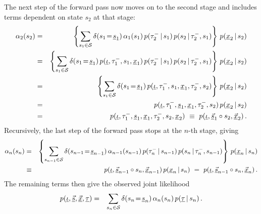 \documentclass[a4paper]{article}
\newcommand{\ui}{\underline{\iota}}
\newcommand{\ut}{\underline{\tau}}
\newcommand{\tm}{\tau^{-}}
\begin{document}
The next step of the forward pass now moves on to the second stage and includes terms dependent on state $s_2$ at that stage:
\begin{eqnarray}
  \alpha_2(s_2) & = & 
\left\{\sum_{s_1\in{\cal S}}\delta(s_1\!=\!\underline{s}_1)\,
\alpha_1(s_1)\,p(\tm_2\,|\,s_1)\,p(s_2\,|\,\tm_2,s_1)\right\}
\,p(\underline{x}_2\,|\,s_2)
\nonumber\\&=&
\left\{\sum_{s_1\in{\cal S}}\delta(s_1\!=\!\underline{s}_1)\,
p(\ui,\tm_1,s_1,\underline{x}_1)\,p(\tm_2\,|\,s_1)\,p(s_2\,|\,\tm_2,s_1)\right\}
\,p(\underline{x}_2\,|\,s_2)
\nonumber\\&=&
\left\{\sum_{s_1\in{\cal S}}\delta(s_1\!=\!\underline{s}_1)\,
p(\ui,\tm_1,s_1,\underline{x}_1,\tm_2,s_2)\right\}
\,p(\underline{x}_2\,|\,s_2)
\nonumber\\&=&
p(\ui,\tm_1,\underline{s}_1,\underline{x}_1,\tm_2,s_2)\,p(\underline{x}_2\,|\,s_2)
\nonumber\\&=&
p(\ui,\tm_1,\underline{s}_1,\underline{x}_1,\tm_2,s_2,\underline{x}_2)
~\equiv~p(\ui,\underline{\vec{s}}_1\circ s_2,\underline{\vec{x}}_2)
\,.
\label{eq:alpha_2}
\end{eqnarray}
Recursively, the last step of the forward pass stops at the $n$-th stage, giving
\begin{eqnarray}
  \alpha_n(s_n) & = & 
\left\{\sum_{s_{n-1}\in{\cal S}}\delta(s_{n-1}\!=\!\underline{s}_{n-1})\,
\alpha_{n-1}(s_{n-1})\,p(\tm_n\,|\,s_{n-1})\,p(s_n\,|\,\tm_n,s_{n-1})\right\}
\,p(\underline{x}_n\,|\,s_n)
\nonumber\\&\equiv&
p(\ui,\underline{\vec{s}}_{n-1}\circ s_n,\underline{\vec{x}}_{n-1})\,p(\underline{x}_n\,|\,s_n)
~=~p(\ui,\underline{\vec{s}}_{n-1}\circ s_n,\underline{\vec{x}}_n)
\,.
\label{eq:alpha_n}
\end{eqnarray}
The remaining terms then give the observed joint likelihood
\begin{eqnarray}
   p(\ui,\underline{\vec{s}},\underline{\vec{x}},\ut) 
& = & 
   \sum_{s_n\in{\cal S}}\delta(s_n\!=\!\underline{s}_n)\,\alpha_n(s_n)\,p(\ut\,|\,s_n)\,.
\label{eq:alpha_n_beta_n}
\end{eqnarray}
\end{document}
